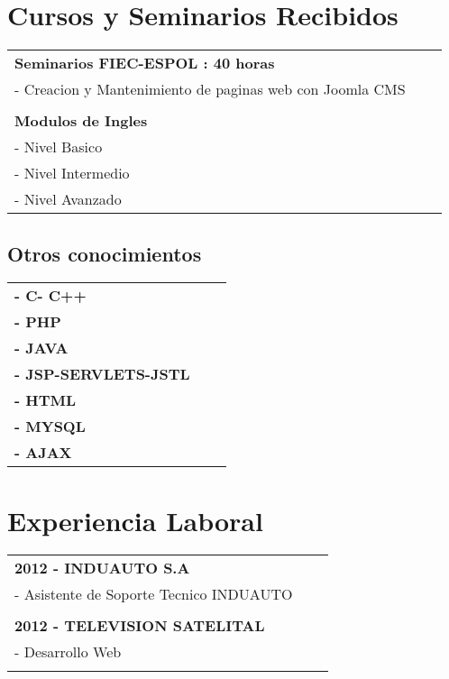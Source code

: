 \documentclass[letterpaper,11pt]{article}
\begin{document}
\section{Cursos y Seminarios Recibidos}

\begin{tabular}{lll}

\textbf{Seminarios FIEC-ESPOL : 40 horas} \\
- Creacion y Mantenimiento de paginas web con Joomla CMS\\ \\

\textbf{Modulos de Ingles}\\
- Nivel Basico\\
- Nivel Intermedio\\ 
- Nivel Avanzado\\ 
\end{tabular}
\subsection{Otros conocimientos}
\begin{tabular}{lll}

\textbf{- C- C++} \\
\textbf{- PHP} \\
\textbf{- JAVA} \\
\textbf{- JSP-SERVLETS-JSTL} \\
\textbf{- HTML} \\
\textbf{- MYSQL} \\
\textbf{- AJAX} \\
\end{tabular}


\section{Experiencia Laboral}

\begin{tabular}{lll}

\textbf{2012 - INDUAUTO S.A}\\
- Asistente de Soporte Tecnico INDUAUTO \\ \\

\textbf{2012 - TELEVISION SATELITAL}\\
- Desarrollo Web \\ \\

\end{tabular}
\end{document}
